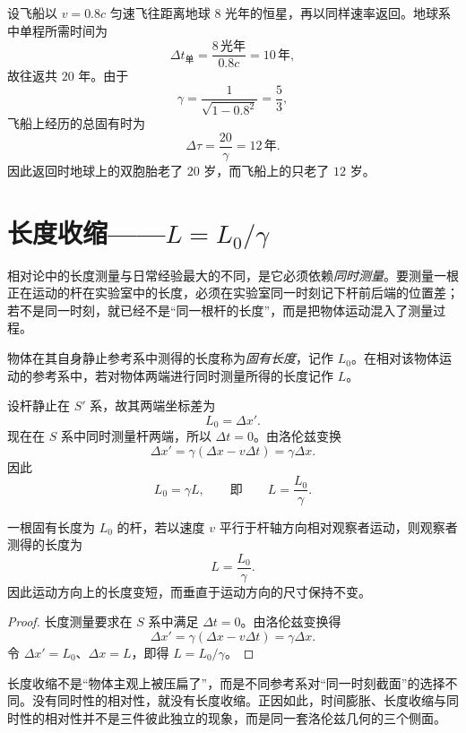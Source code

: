 \begin{example}[双生子计算]
设飞船以 $v=0.8c$ 匀速飞往距离地球 $8$ 光年的恒星，再以同样速率返回。地球系中单程所需时间为
\[
\Delta t_{\text{单}}=\frac{8\,\text{光年}}{0.8c}=10\,\text{年},
\]
故往返共 $20$ 年。由于
\[
\gamma=\frac{1}{\sqrt{1-0.8^2}}=\frac{5}{3},
\]
飞船上经历的总固有时为
\[
\Delta \tau=\frac{20}{\gamma}=12\,\text{年}.
\]
因此返回时地球上的双胞胎老了 $20$ 岁，而飞船上的只老了 $12$ 岁。
\end{example}

\section{长度收缩——$L=L_0/\gamma$}

相对论中的长度测量与日常经验最大的不同，是它必须依赖\emph{同时测量}。要测量一根正在运动的杆在实验室中的长度，必须在实验室同一时刻记下杆前后端的位置差；若不是同一时刻，就已经不是“同一根杆的长度”，而是把物体运动混入了测量过程。

\begin{definition}
物体在其自身静止参考系中测得的长度称为\emph{固有长度}，记作 $L_0$。在相对该物体运动的参考系中，若对物体两端进行同时测量所得的长度记作 $L$。
\end{definition}

设杆静止在 $S'$ 系，故其两端坐标差为
\[
L_0=\Delta x'.
\]
现在在 $S$ 系中同时测量杆两端，所以 $\Delta t=0$。由洛伦兹变换
\[
\Delta x'=\gamma(\Delta x-v\Delta t)=\gamma\Delta x.
\]
因此
\[
L_0=\gamma L,
\qquad \text{即} \qquad L=\frac{L_0}{\gamma}.
\]

\begin{theorem}[长度收缩]
一根固有长度为 $L_0$ 的杆，若以速度 $v$ 平行于杆轴方向相对观察者运动，则观察者测得的长度为
\[
L=\frac{L_0}{\gamma}.
\]
因此运动方向上的长度变短，而垂直于运动方向的尺寸保持不变。
\end{theorem}

\begin{proof}
长度测量要求在 $S$ 系中满足 $\Delta t=0$。由洛伦兹变换得
\[
\Delta x'=\gamma(\Delta x-v\Delta t)=\gamma\Delta x.
\]
令 $\Delta x'=L_0$、$\Delta x=L$，即得 $L=L_0/\gamma$。
\end{proof}

\begin{remark}
长度收缩不是“物体主观上被压扁了”，而是不同参考系对“同一时刻截面”的选择不同。没有同时性的相对性，就没有长度收缩。正因如此，时间膨胀、长度收缩与同时性的相对性并不是三件彼此独立的现象，而是同一套洛伦兹几何的三个侧面。
\end{remark}

